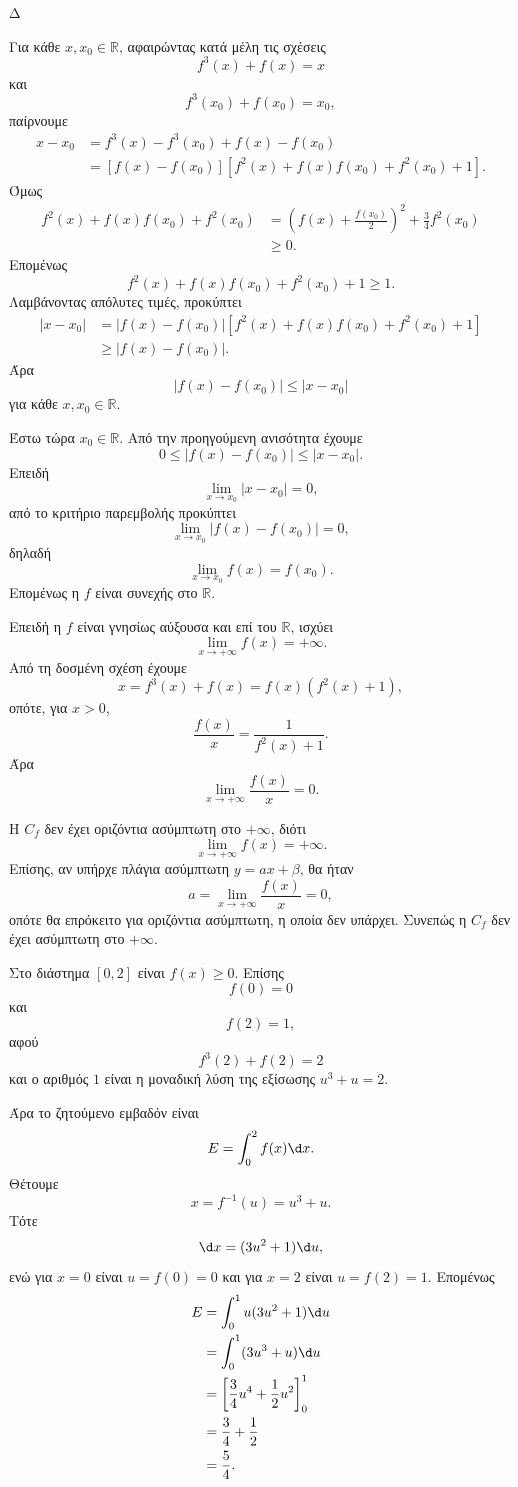 \begin{thema}{Δ}
\begin{erwthma}
\item Για κάθε $x,x_0\in\mathbb{R}$, αφαιρώντας κατά μέλη τις σχέσεις
\[
f^3(x)+f(x)=x
\]
και
\[
f^3(x_0)+f(x_0)=x_0,
\]
παίρνουμε
\begin{align*}
x-x_0
&=f^3(x)-f^3(x_0)+f(x)-f(x_0)\\
&=\left[f(x)-f(x_0)\right]
\left[f^2(x)+f(x)f(x_0)+f^2(x_0)+1\right].
\end{align*}
Όμως
\begin{align*}
f^2(x)+f(x)f(x_0)+f^2(x_0)
&=\left(f(x)+\frac{f(x_0)}{2}\right)^2
+\frac{3}{4}f^2(x_0)\\
&\geq0.
\end{align*}
Επομένως
\[
f^2(x)+f(x)f(x_0)+f^2(x_0)+1\geq1.
\]
Λαμβάνοντας απόλυτες τιμές, προκύπτει
\begin{align*}
|x-x_0|
&=|f(x)-f(x_0)|
\left[f^2(x)+f(x)f(x_0)+f^2(x_0)+1\right]\\
&\geq|f(x)-f(x_0)|.
\end{align*}
Άρα
\[
{|f(x)-f(x_0)|\leq|x-x_0|}
\]
για κάθε $x,x_0\in\mathbb{R}$.

Έστω τώρα $x_0\in\mathbb{R}$. Από την προηγούμενη ανισότητα έχουμε
\[
0\leq|f(x)-f(x_0)|\leq|x-x_0|.
\]
Επειδή
\[
\lim_{x\to x_0}|x-x_0|=0,
\]
από το κριτήριο παρεμβολής προκύπτει
\[
\lim_{x\to x_0}|f(x)-f(x_0)|=0,
\]
δηλαδή
\[
\lim_{x\to x_0}f(x)=f(x_0).
\]
Επομένως η $f$ είναι συνεχής στο $\mathbb{R}$.

\item Επειδή η $f$ είναι γνησίως αύξουσα και επί του $\mathbb{R}$, ισχύει
\[
\lim_{x\to+\infty}f(x)=+\infty.
\]
Από τη δοσμένη σχέση έχουμε
\[
x=f^3(x)+f(x)=f(x)\left(f^2(x)+1\right),
\]
οπότε, για $x>0$,
\[
\frac{f(x)}{x}=\frac{1}{f^2(x)+1}.
\]
Άρα
\[
{\lim_{x\to+\infty}\frac{f(x)}{x}=0}.
\]

Η $C_f$ δεν έχει οριζόντια ασύμπτωτη στο $+\infty$, διότι
\[
\lim_{x\to+\infty}f(x)=+\infty.
\]
Επίσης, αν υπήρχε πλάγια ασύμπτωτη $y=ax+\beta$, θα ήταν
\[
a=\lim_{x\to+\infty}\frac{f(x)}{x}=0,
\]
οπότε θα επρόκειτο για οριζόντια ασύμπτωτη, η οποία δεν υπάρχει. Συνεπώς η $C_f$ δεν έχει ασύμπτωτη στο $+\infty$.

\item Στο διάστημα $[0,2]$ είναι $f(x)\geq0$. Επίσης
\[
f(0)=0
\]
και
\[
f(2)=1,
\]
αφού
\[
f^3(2)+f(2)=2
\]
και ο αριθμός $1$ είναι η μοναδική λύση της εξίσωσης $u^3+u=2$.

Άρα το ζητούμενο εμβαδόν είναι
\[
E=\int_0^2 f(x)\d x.
\]
Θέτουμε
\[
x=f^{-1}(u)=u^3+u.
\]
Τότε
\[
\d x=(3u^2+1)\d u,
\]
ενώ για $x=0$ είναι $u=f(0)=0$ και για $x=2$ είναι $u=f(2)=1$. Επομένως
\begin{align*}
E
&=\int_0^1 u(3u^2+1)\d u\\
&=\int_0^1(3u^3+u)\d u\\
&=\left[\frac{3}{4}u^4+\frac{1}{2}u^2\right]_0^1\\
&=\frac{3}{4}+\frac{1}{2}\\
&={\frac{5}{4}}.
\end{align*}
\end{erwthma}
\end{thema}

